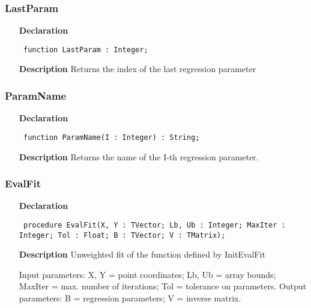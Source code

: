 \documentclass[12pt,a4paper,oneside]{report}
\newcommand{\declarationitem}[1]{\textbf{#1}}
\newcommand{\descriptiontitle}[1]{\textbf{#1}}
\newcommand{\code}[1]{\texttt{#1}}
\begin{document}
\subsubsection{LastParam}
\label{uevalfit-LastParam}
\begin{itemize}\item[\declarationitem{Declaration}\hfill]
	\begin{flushleft}
		\code{
			function LastParam : Integer;}
		
	\end{flushleft}
	
	\par
	\item[\descriptiontitle{Description}]
	Returns the index of the last regression parameter
	
\end{itemize}
\subsubsection{ParamName}
\label{uevalfit-ParamName}
\begin{itemize}\item[\declarationitem{Declaration}\hfill]
	\begin{flushleft}
		\code{
			function ParamName(I : Integer) : String;}
		
	\end{flushleft}
	
	\par
	\item[\descriptiontitle{Description}]
	Returns the name of the I{-}th regression parameter.
	
\end{itemize}
\subsubsection{EvalFit}
\label{uevalfit-EvalFit}
\begin{itemize}\item[\declarationitem{Declaration}\hfill]
	\begin{flushleft}
		\code{
			procedure EvalFit(X, Y : TVector; Lb, Ub : Integer; MaxIter : Integer; Tol : Float; B : TVector; V : TMatrix);}
		
	\end{flushleft}
	
	\par
	\item[\descriptiontitle{Description}]
	Unweighted fit of the function defined by InitEvalFit
	
	Input parameters: X, Y = point coordinates; Lb, Ub = array bounds; MaxIter = max. number of iterations; Tol = tolerance on parameters. Output parameters: B = regression parameters; V = inverse matrix.
	
\end{itemize}
\end{document}
